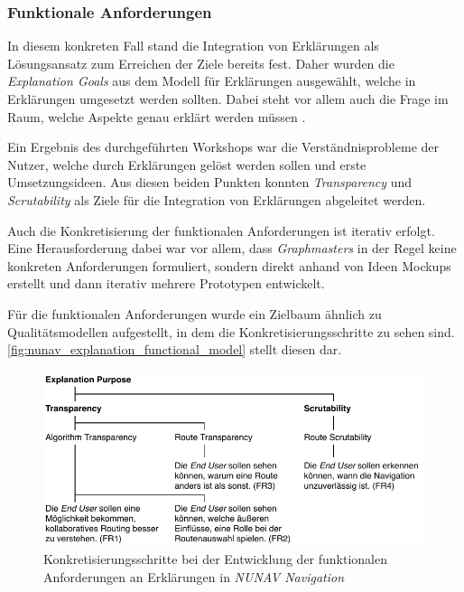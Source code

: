 \subsubsection{Funktionale Anforderungen}

In diesem konkreten Fall stand die Integration von Erklärungen als Lösungsansatz zum Erreichen der Ziele bereits fest. Daher wurden die \textit{Explanation Goals} aus dem Modell für Erklärungen ausgewählt, welche in Erklärungen umgesetzt werden sollten. Dabei steht vor allem auch die Frage im Raum, welche Aspekte genau erklärt werden müssen \cite{kohl_explainability_2019}.

Ein Ergebnis des durchgeführten Workshops war die Verständnisprobleme der Nutzer, welche durch Erklärungen gelöst werden sollen und erste Umsetzungsideen. Aus diesen beiden Punkten konnten \textit{Transparency} und \textit{Scrutability} als Ziele für die Integration von Erklärungen abgeleitet werden.

Auch die Konkretisierung der funktionalen Anforderungen ist iterativ erfolgt. Eine Herausforderung dabei war vor allem, dass \textit{Graphmasters} in der Regel keine konkreten Anforderungen formuliert, sondern direkt anhand von Ideen Mockups erstellt und dann iterativ mehrere Prototypen entwickelt.

Für die funktionalen Anforderungen wurde ein Zielbaum ähnlich zu Qualitätsmodellen aufgestellt, in dem die Konkretisierungsschritte zu sehen sind. \autoref{fig:nunav_explanation_functional_model} stellt diesen dar.

\begin{figure}[htb!]
    \centering
    \includegraphics[]{contents/06_model_evaluation/01_integration/res/functional_model.pdf}
    \caption{Konkretisierungsschritte bei der Entwicklung der funktionalen Anforderungen an Erklärungen in \textit{NUNAV Navigation}}
    \label{fig:nunav_explanation_functional_model}
\end{figure}


